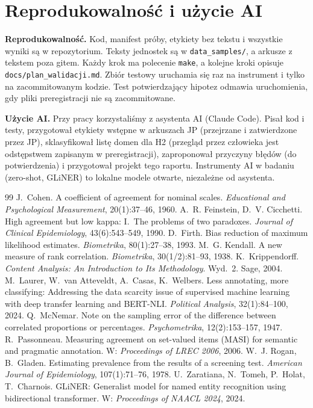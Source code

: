 \documentclass[11pt,a4paper]{article}
\newcommand{\kod}[1]{\texttt{#1}}
\begin{document}
\section{Reprodukowalność i użycie AI}

\textbf{Reprodukowalność.} Kod, manifest próby, etykiety bez tekstu i wszystkie wyniki są w repozytorium. Teksty jednostek są w \kod{data\_samples/}, a arkusze z tekstem poza gitem. Każdy krok ma polecenie \kod{make}, a kolejne kroki opisuje \kod{docs/plan\_walidacji.md}. Zbiór testowy uruchamia się raz na instrument i tylko na zacommitowanym kodzie. Test potwierdzający hipotez odmawia uruchomienia, gdy pliki preregistracji nie są zacommitowane.

\textbf{Użycie AI.} Przy pracy korzystaliśmy z asystenta AI (Claude Code). Pisał kod i testy, przygotował etykiety wstępne w arkuszach JP (przejrzane i zatwierdzone przez JP), sklasyfikował listę domen dla H2 (przegląd przez człowieka jest odstępstwem zapisanym w preregistracji), zaproponował przyczyny błędów (do potwierdzenia) i przygotował projekt tego raportu. Instrumenty AI w badaniu (zero-shot, GLiNER) to lokalne modele otwarte, niezależne od asystenta.

\begin{thebibliography}{99}
 J.~Cohen. A coefficient of agreement for nominal scales. \textit{Educational and Psychological Measurement}, 20(1):37--46, 1960.
 A.~R. Feinstein, D.~V. Cicchetti. High agreement but low kappa: I.~The problems of two paradoxes. \textit{Journal of Clinical Epidemiology}, 43(6):543--549, 1990.
 D.~Firth. Bias reduction of maximum likelihood estimates. \textit{Biometrika}, 80(1):27--38, 1993.
 M.~G. Kendall. A new measure of rank correlation. \textit{Biometrika}, 30(1/2):81--93, 1938.
 K.~Krippendorff. \textit{Content Analysis: An Introduction to Its Methodology}. Wyd.~2. Sage, 2004.
 M.~Laurer, W.~van Atteveldt, A.~Casas, K.~Welbers. Less annotating, more classifying: Addressing the data scarcity issue of supervised machine learning with deep transfer learning and BERT-NLI. \textit{Political Analysis}, 32(1):84--100, 2024.
 Q.~McNemar. Note on the sampling error of the difference between correlated proportions or percentages. \textit{Psychometrika}, 12(2):153--157, 1947.
 R.~Passonneau. Measuring agreement on set-valued items (MASI) for semantic and pragmatic annotation. W: \textit{Proceedings of LREC 2006}, 2006.
 W.~J. Rogan, B.~Gladen. Estimating prevalence from the results of a screening test. \textit{American Journal of Epidemiology}, 107(1):71--76, 1978.
 U.~Zaratiana, N.~Tomeh, P.~Holat, T.~Charnois. GLiNER: Generalist model for named entity recognition using bidirectional transformer. W: \textit{Proceedings of NAACL 2024}, 2024.
\end{thebibliography}
\end{document}
